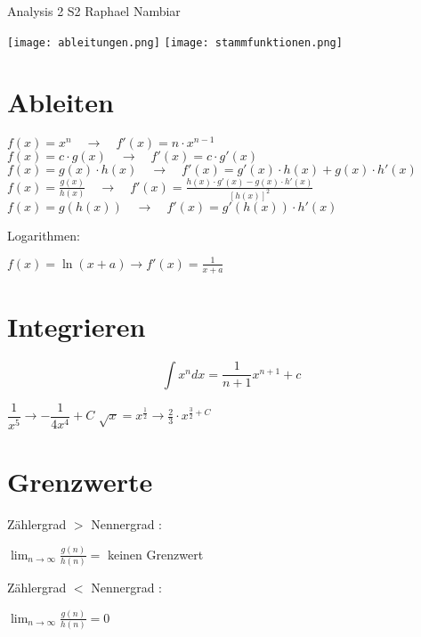 



\begin{multicols*}{3}

    \DocumentInfo
    {Analysis 2 S2} %
    {Raphael Nambiar} %





    \texttt{[image: ableitungen.png]}
    \texttt{[image: stammfunktionen.png]}

    \section{ Ableiten }

    $f(x) = x^n \quad \rightarrow \quad f'(x) = n \cdot x^{n-1}$
    \WhiteSpace
    $f(x) = c \cdot g(x) \quad \rightarrow \quad f'(x) = c \cdot g'(x)$
    \WhiteSpace
    $f(x) = g(x) \cdot h(x) \quad \rightarrow \quad f'(x) = g'(x) \cdot h(x) + g(x) \cdot h'(x)$
    \WhiteSpace
    $f(x) = \frac{g(x)}{h(x)} \quad \rightarrow \quad f'(x)=\frac{h(x) \cdot g'(x) - g(x) \cdot h'(x)}{\left[h(x)\right]^2}$
    \WhiteSpace
    $f(x) = g(h(x)) \quad \rightarrow \quad f'(x) = g'(h(x)) \cdot h'(x)$
    \WhiteSpace

    {Logarithmen:}

    {$f(x) = \ln(x+a) \to f'(x) = \frac{1}{x+a}$}
    \WhiteSpace
    \section{ Integrieren }
    \WhiteSpace
    {$$\int x^n dx = \frac{1}{n+1}x^{n+1}+c$$}

    \WhiteSpace
    {$\dfrac{1}{x^5} \rightarrow -\dfrac{1}{4x^4} + C$}
    \WhiteSpace
    \WhiteSpace
    {$\sqrt{x} = x^{\frac{1}{2}} \rightarrow \frac{2}{3}\cdot x^{\frac{3}{2} + C} $}
    \WhiteSpace
    \WhiteSpace
    \vfill\null
    \columnbreak
    \section{Grenzwerte}
    \WhiteSpace
    {Zählergrad $>$ Nennergrad : }

    {\large $ \lim_{n\to \infty} \frac{g(n)}{h(n)} = $ keinen Grenzwert}
    \WhiteSpace

    {Zählergrad $<$ Nennergrad : }

    { \large $ \lim_{n\to \infty} \frac{g(n)}{h(n)} = 0$}
    \WhiteSpace


\end{multicols*}
